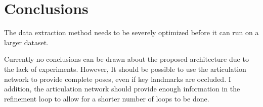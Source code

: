 \chapter{Conclusions}

The data extraction method needs to be severely optimized before it can run on a larger dataset. 

Currently no conclusions can be drawn about the proposed architecture due to the lack of experiments. However, It should be possible to use the articulation network to provide complete poses, even if key landmarks are occluded. I addition, the articulation network should provide enough information in the refinement loop to allow for a shorter number of loops to be done.
